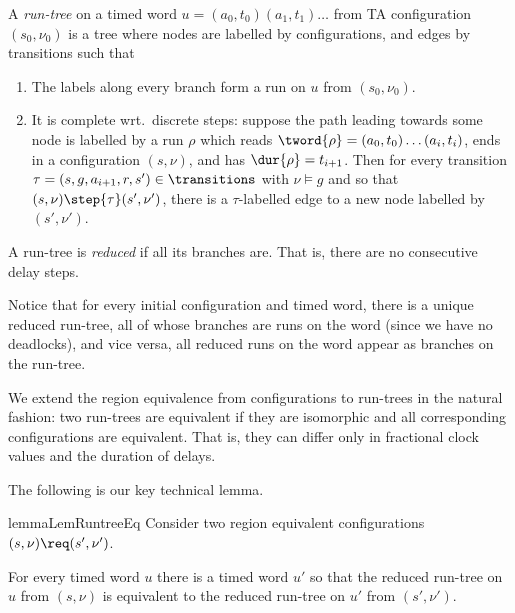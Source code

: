 \begin{definition}
    A \emph{run-tree} on a timed word $u=(a_0,t_0)(a_1,t_1)\ldots$ from TA configuration $(s_0,\nu_0)$ is a tree
    where nodes are labelled by configurations,
    and edges by transitions such that
    \begin{enumerate}
        \item 
    The labels along every branch form a run on $u$ from $(s_0,\nu_0)$.
\item It is complete wrt.~discrete steps:
    suppose %
    the path leading towards some node is labelled by a run $\rho$
    which reads $\tword{\rho}=(a_0,t_0)\ldots(a_i,t_i)$,
    ends in a configuration $(s,\nu)$,
    and has $\dur{\rho}=t_{i+1}$. %
    Then 
    for 
    every transition $\tau=(s,g,a_{i+1},r,s')\in \transitions$
    with $\nu\models g$
    and so that $(s,\nu)\step{\tau}(s',\nu')$,
    there is a $\tau$-labelled edge to a new node labelled by $(s',\nu')$.
    \end{enumerate}
    A run-tree is \emph{reduced} if all its branches are. That is, there are no consecutive delay steps.
\end{definition}
Notice that for every initial configuration and timed word, there is a unique reduced run-tree,
all of whose branches are runs on the word (since we have no deadlocks),
and vice versa, all reduced runs on the word appear as branches on the run-tree.

We extend the region equivalence from configurations to run-trees in the natural fashion:
two run-trees are equivalent if they are isomorphic and all corresponding configurations are equivalent.
That is, they can differ only in fractional clock values and the duration of delays.



The following is our key technical lemma.


\begin{restatable}{lemma}{LemRuntreeEq}
\label{lem:runtree-eq}
Consider two region equivalent configurations
$(s,\nu)\req(s',\nu')$.

For every timed word $u$
there is a timed word $u'$
so that the reduced run-tree on $u$
from $(s,\nu)$
is equivalent to 
the reduced run-tree on $u'$ from
$(s',\nu')$.
\end{restatable}

